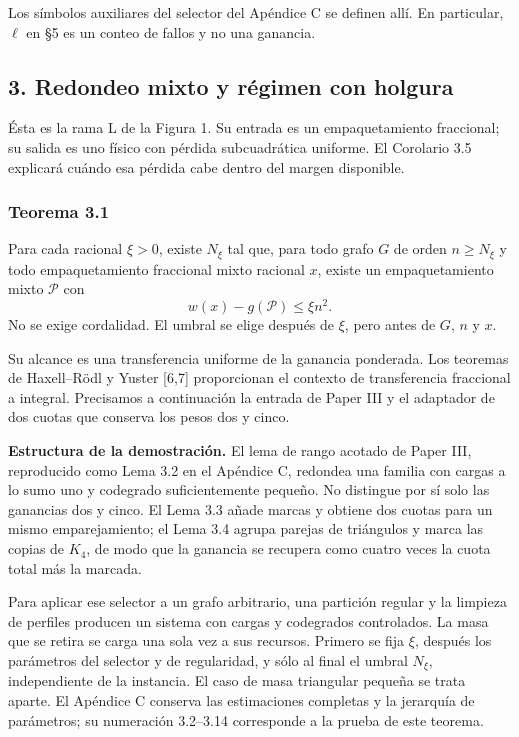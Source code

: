 \documentclass[spanish,11pt,a4paper]{article}
\begin{document}
Los símbolos auxiliares del selector del Apéndice C se definen allí. En particular, \(\ell\) en §5 es un conteo de fallos y no una ganancia.

\subsection{3. Redondeo mixto y régimen con holgura}\label{redondeo-mixto-y-ruxe9gimen-con-holgura}

Ésta es la rama L de la Figura 1. Su entrada es un empaquetamiento fraccional; su salida es uno físico con pérdida subcuadrática uniforme. El Corolario 3.5 explicará cuándo esa pérdida cabe dentro del margen disponible.

\subsubsection{Teorema 3.1}\label{teorema-3.1}

Para cada racional \(\xi>0\), existe \(N_\xi\) tal que, para todo grafo \(G\) de orden \(n\ge N_\xi\) y todo empaquetamiento fraccional mixto racional \(x\), existe un empaquetamiento mixto \(\mathcal P\) con \[
w(x)-g(\mathcal P)\le\xi n^2.
\tag{3.1}
\] No se exige cordalidad. El umbral se elige después de \(\xi\), pero antes de \(G\), \(n\) y \(x\).

Su alcance es una transferencia uniforme de la ganancia ponderada. Los teoremas de Haxell--Rödl y Yuster {[}6,7{]} proporcionan el contexto de transferencia fraccional a integral. Precisamos a continuación la entrada de Paper III y el adaptador de dos cuotas que conserva los pesos dos y cinco.

\textbf{Estructura de la demostración.} El lema de rango acotado de Paper III, reproducido como Lema 3.2 en el Apéndice C, redondea una familia con cargas a lo sumo uno y codegrado suficientemente pequeño. No distingue por sí solo las ganancias dos y cinco. El Lema 3.3 añade marcas y obtiene dos cuotas para un mismo emparejamiento; el Lema 3.4 agrupa parejas de triángulos y marca las copias de \(K_4\), de modo que la ganancia se recupera como cuatro veces la cuota total más la marcada.

Para aplicar ese selector a un grafo arbitrario, una partición regular y la limpieza de perfiles producen un sistema con cargas y codegrados controlados. La masa que se retira se carga una sola vez a sus recursos. Primero se fija \(\xi\), después los parámetros del selector y de regularidad, y sólo al final el umbral \(N_\xi\), independiente de la instancia. El caso de masa triangular pequeña se trata aparte. El Apéndice C conserva las estimaciones completas y la jerarquía de parámetros; su numeración 3.2--3.14 corresponde a la prueba de este teorema.
\end{document}
